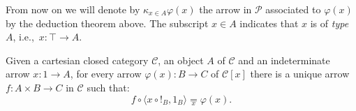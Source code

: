 \begin{notation}
    From now on we will denote by $\kappa_{x \in A}\varphi(x)$ the arrow in $\mathcal P$ associated to $\varphi(x)$ by the deduction theorem above.
    The subscript $x \in A$ indicates that $x$ is of \textit{type} $A$, i.e.,\ $x : \top \to A$.
\end{notation}

\begin{remark}
\end{remark}

\begin{theorem}
    Given a cartesian closed category $\mathcal C$, an object $A$ of $\mathcal C$ and an indeterminate arrow $x : 1 \to A$, for every arrow $\varphi(x) : B \to C$ of $\mathcal C[x]$
    there is a unique arrow $f : A \times B \to C$ in $\mathcal C$ such that:
    \[ f \circ \langle x \circ !_B, 1_B\rangle \underset{x}{=} \varphi(x). \]
\end{theorem}

